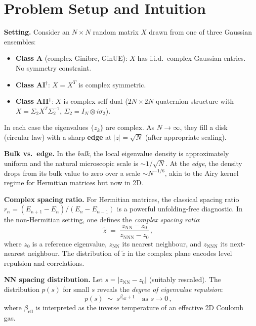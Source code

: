 \documentclass[11pt,a4paper]{article}
\theoremstyle{definition}
\begin{document}
\section{Problem Setup and Intuition}

\textbf{Setting.}
Consider an $N\times N$ random matrix $X$ drawn from one of three Gaussian ensembles:
\begin{itemize}[nosep]
  \item \textbf{Class A} (complex Ginibre, GinUE): $X$ has i.i.d.\ complex Gaussian entries. No symmetry constraint.
  \item \textbf{Class AI$^\dagger$}: $X = X^T$ is complex symmetric.
  \item \textbf{Class AII$^\dagger$}: $X$ is complex self-dual ($2N\times 2N$ quaternion structure with $X = \Sigma_2 X^T \Sigma_2^{-1}$, $\Sigma_2 = I_N \otimes i\sigma_2$).
\end{itemize}
In each case the eigenvalues $\{z_k\}$ are complex.  As $N\to\infty$, they fill a disk (circular law) with a sharp \textbf{edge} at $|z| = \sqrt{N}$ (after appropriate scaling).

\textbf{Bulk vs.\ edge.}
In the \emph{bulk}, the local eigenvalue density is approximately uniform and the natural microscopic scale is $\sim 1/\sqrt{N}$.
At the \emph{edge}, the density drops from its bulk value to zero over a scale $\sim N^{-1/6}$, akin to the Airy kernel regime for Hermitian matrices but now in 2D.

\textbf{Complex spacing ratio.}
For Hermitian matrices, the classical spacing ratio $r_n = (E_{n+1}-E_n)/(E_n - E_{n-1})$ is a powerful unfolding-free diagnostic.
In the non-Hermitian setting, one defines the \emph{complex spacing ratio}:
\begin{equation}
  \tilde{z} \;=\; \frac{z_{\mathrm{NN}} - z_0}{z_{\mathrm{NNN}} - z_0}\,,
\end{equation}
where $z_0$ is a reference eigenvalue, $z_{\mathrm{NN}}$ its nearest neighbour, and $z_{\mathrm{NNN}}$ its next-nearest neighbour.  The distribution of $\tilde{z}$ in the complex plane encodes level repulsion and correlations.

\textbf{NN spacing distribution.}
Let $s = |z_{\mathrm{NN}} - z_0|$ (suitably rescaled).  The distribution $p(s)$ for small $s$ reveals the \emph{degree of eigenvalue repulsion}:
\begin{equation}
  p(s) \;\sim\; s^{\beta_{\mathrm{eff}} + 1} \quad \text{as } s\to 0\,,
\end{equation}
where $\beta_{\mathrm{eff}}$ is interpreted as the inverse temperature of an effective 2D Coulomb gas.
\end{document}
